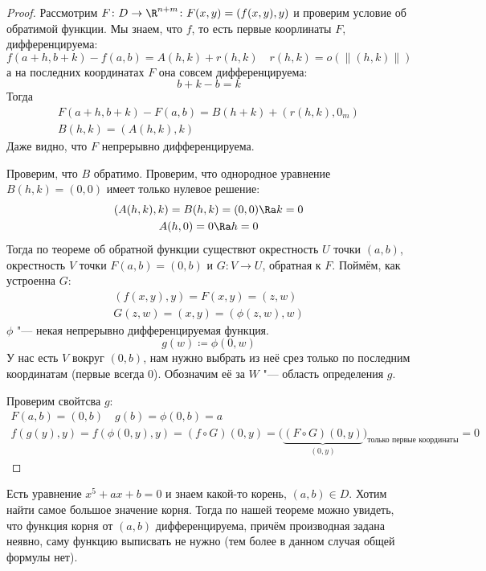 \begin{proof}
	Рассмотрим $F\colon D \to \R^{n+m}\colon F(x, y) = (f(x, y), y)$ и проверим условие об обратимой функции.
	Мы знаем, что $f$, то есть первые коорлинаты $F$, дифференцируема:
	\[ f(a+h, b+k) - f(a, b) = A(h, k) + r(h, k) \quad r(h, k) = o(\|(h, k)\|) \]
	а на последних координатах $F$ она совсем дифференцируема:
	\[ b + k - b = k \]
	Тогда
	\begin{gather*}
		F(a+h, b+k) - F(a, b) = B(h+k) + (r(h, k), 0_m) \\
		B(h, k) = (A(h, k), k)
	\end{gather*}
	Даже видно, что $F$ непрерывно дифференцируема.

	Проверим, что $B$ обратимо. Проверим, что однородное уравнение $B(h, k) = (0, 0)$ имеет только нулевое решение:
	\begin{gather*}
		(A(h, k), k) = B(h, k) = (0, 0) \Ra k = 0 \\
		A(h, 0) = 0 \Ra h = 0
	\end{gather*}
	Тогда по теореме об обратной функции существют окрестность $U$ точки $(a, b)$,
	окрестность $V$ точки $F(a, b) = (0, b)$ и $G\colon V \to U$, обратная к $F$.
	Поймём, как устроенна $G$:
	\begin{gather*}
		(f(x, y), y) = F(x, y) = (z, w) \\
		G(z, w) = (x, y) = (\phi(z, w), w)
	\end{gather*}
	$\phi$ "--- некая непрерывно дифференцируемая функция.
	\[ g(w) \coloneqq \phi(0, w) \]
	У нас есть $V$ вокруг $(0, b)$, нам нужно выбрать из неё срез только по последним координатам (первые всегда 0).
	Обозначим её за $W$ "--- область определения $g$.

	Проверим свойтсва $g$:
	\begin{gather*}
		F(a, b) = (0, b) \quad g(b) = \phi(0, b) = a \\
		f(g(y), y) = f(\phi(0, y), y) = (f \circ G)(0, y)
			= \biggl(\underbrace{(F \circ G)(0, y)}_{(0, y)}\biggr)_{\text{только первые координаты}} = 0
	\end{gather*}
\end{proof}

\begin{exmp}
	Есть уравнение $x^5 + ax + b = 0$ и знаем какой-то корень, $(a, b) \in D$.
	Хотим найти самое большое значение корня.
	Тогда по нашей теореме можно увидеть, что функция корня от $(a, b)$ дифференцируема,
	причём производная задана неявно, саму функцию выписвать не нужно (тем более в данном случая общей формулы нет).
\end{exmp}

